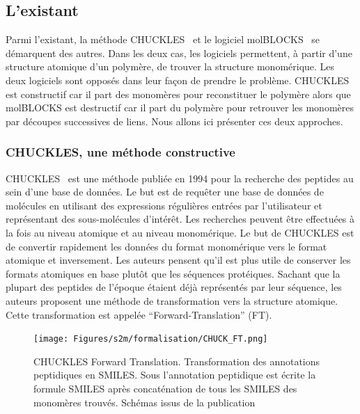 \subsection{L'existant}

Parmi l'existant, la méthode CHUCKLES~\cite{siani_chuckles:_1994} et le logiciel molBLOCKS~\cite{ghersi_molblocks:_2014} se démarquent des autres.
Dans les deux cas, les logiciels permettent, à partir d'une structure atomique d'un polymère, de trouver la structure monomérique.
Les deux logiciels sont opposés dans leur façon de prendre le problème.
CHUCKLES est constructif car il part des monomères pour reconstituer le polymère alors que molBLOCKS est destructif car il part du polymère pour retrouver les monomères par découpes successives de liens.
Nous allons ici présenter ces deux approches.


\subsubsection{CHUCKLES, une méthode constructive}

CHUCKLES~\cite{siani_chuckles:_1994} est une méthode publiée en 1994 pour la recherche des peptides au sein d'une base de données.
Le but est de requêter une base de données de molécules en utilisant des expressions régulières entrées par l'utilisateur et représentant des sous-molécules d'intérêt.
Les recherches peuvent être effectuées à la fois au niveau atomique et au niveau monomérique.
Le but de CHUCKLES est de convertir rapidement les données du format monomérique vers le format atomique et inversement.
Les auteurs pensent qu'il est plus utile de conserver les formats atomiques en base plutôt que les séquences protéiques.
Sachant que la plupart des peptides de l'époque étaient déjà représentés par leur séquence, les auteurs proposent une méthode de transformation vers la structure atomique.
Cette transformation est appelée ``Forward-Translation'' (FT).

\begin{figure}[!ht]
  \begin{center}
    \texttt{[image: Figures/s2m/formalisation/CHUCK\_FT.png]}
    \caption{\label{chuck_ft}CHUCKLES Forward Translation.
    Transformation des annotations peptidiques en SMILES.
    Sous l'annotation peptidique est écrite la formule SMILES après concaténation de tous les SMILES des monomères trouvés.
    Schémas issus de la publication}
  \end{center}
\end{figure}

